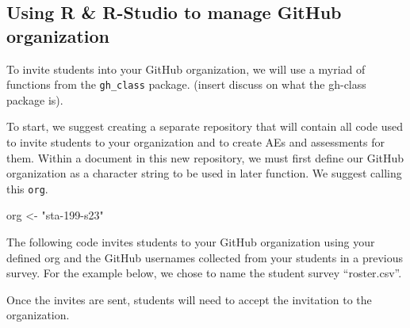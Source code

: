 \documentclass[
  12pt]{article}
\newenvironment{Shaded}{\begin{snugshade}}{\end{snugshade}}
\newcommand{\AttributeTok}[1]{\textcolor[rgb]{0.40,0.45,0.13}{#1}}
\newcommand{\CommentTok}[1]{\textcolor[rgb]{0.37,0.37,0.37}{#1}}
\newcommand{\FunctionTok}[1]{\textcolor[rgb]{0.28,0.35,0.67}{#1}}
\newcommand{\NormalTok}[1]{\textcolor[rgb]{0.00,0.23,0.31}{#1}}
\newcommand{\OtherTok}[1]{\textcolor[rgb]{0.00,0.23,0.31}{#1}}
\newcommand{\SpecialCharTok}[1]{\textcolor[rgb]{0.37,0.37,0.37}{#1}}
\newcommand{\StringTok}[1]{\textcolor[rgb]{0.13,0.47,0.30}{#1}}
\begin{document}
\hypertarget{using-r-r-studio-to-manage-github-organization}{%
\subsection{Using R \& R-Studio to manage GitHub
organization}\label{using-r-r-studio-to-manage-github-organization}}

To invite students into your GitHub organization, we will use a myriad
of functions from the \texttt{gh\_class} package. (insert discuss on
what the gh-class package is).

To start, we suggest creating a separate repository that will contain
all code used to invite students to your organization and to create AEs
and assessments for them. Within a document in this new repository, we
must first define our GitHub organization as a character string to be
used in later function. We suggest calling this \texttt{org}.

\begin{Shaded}
\begin{Highlighting}[]
\NormalTok{org }\OtherTok{\textless{}{-}} \StringTok{"sta{-}199{-}s23"}
\end{Highlighting}
\end{Shaded}

The following code invites students to your GitHub organization using
your defined org and the GitHub usernames collected from your students
in a previous survey. For the example below, we chose to name the
student survey ``roster.csv''.

\begin{Shaded}
\end{Shaded}

Once the invites are sent, students will need to accept the invitation
to the organization.
\end{document}
